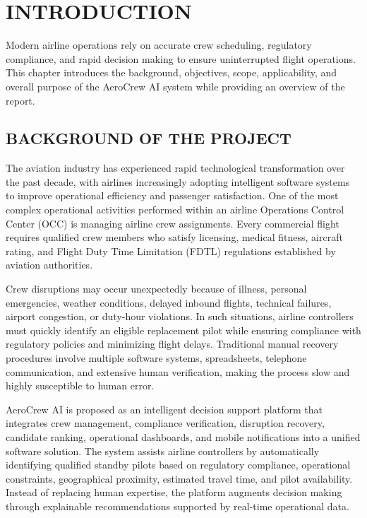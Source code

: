 \documentclass[12pt,a4paper]{report}
\begin{document}

\pagestyle{fancy}
\setcounter{page}{1}


\chapter{INTRODUCTION}

Modern airline operations rely on accurate crew scheduling, regulatory compliance, and rapid decision making to ensure uninterrupted flight operations. This chapter introduces the background, objectives, scope, applicability, and overall purpose of the AeroCrew AI system while providing an overview of the report.

\section{BACKGROUND OF THE PROJECT}

The aviation industry has experienced rapid technological transformation over the past decade, with airlines increasingly adopting intelligent software systems to improve operational efficiency and passenger satisfaction. One of the most complex operational activities performed within an airline Operations Control Center (OCC) is managing airline crew assignments. Every commercial flight requires qualified crew members who satisfy licensing, medical fitness, aircraft rating, and Flight Duty Time Limitation (FDTL) regulations established by aviation authorities.

Crew disruptions may occur unexpectedly because of illness, personal emergencies, weather conditions, delayed inbound flights, technical failures, airport congestion, or duty-hour violations. In such situations, airline controllers must quickly identify an eligible replacement pilot while ensuring compliance with regulatory policies and minimizing flight delays. Traditional manual recovery procedures involve multiple software systems, spreadsheets, telephone communication, and extensive human verification, making the process slow and highly susceptible to human error.

AeroCrew AI is proposed as an intelligent decision support platform that integrates crew management, compliance verification, disruption recovery, candidate ranking, operational dashboards, and mobile notifications into a unified software solution. The system assists airline controllers by automatically identifying qualified standby pilots based on regulatory compliance, operational constraints, geographical proximity, estimated travel time, and pilot availability. Instead of replacing human expertise, the platform augments decision making through explainable recommendations supported by real-time operational data.
\end{document}

